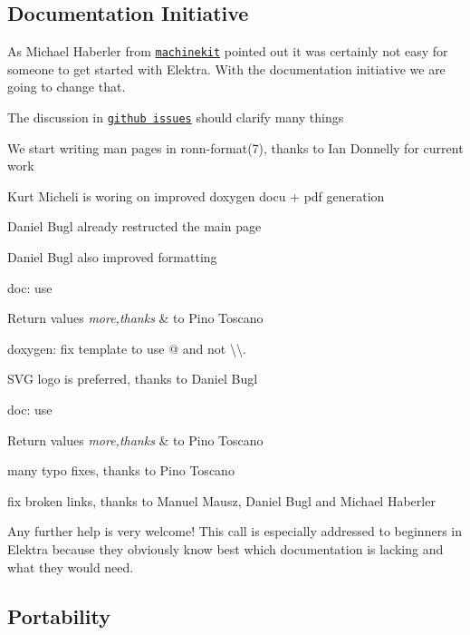 \subsection*{Documentation Initiative}

As Michael Haberler from \href{http://www.machinekit.io/}{\tt machinekit} pointed out it was certainly not easy for someone to get started with Elektra. With the documentation initiative we are going to change that.


\begin{DoxyItemize}
\item The discussion in \href{https://git.libelektra.org/issues}{\tt github issues} should clarify many things
\item We start writing man pages in ronn-\/format(7), thanks to Ian Donnelly for current work
\item Kurt Micheli is woring on improved doxygen docu + pdf generation
\item Daniel Bugl already restructed the main page
\item Daniel Bugl also improved formatting
\item doc\+: use 
\begin{DoxyRetVals}{Return values}
{\em more,thanks} & to Pino Toscano\\
\hline
\end{DoxyRetVals}

\item doxygen\+: fix template to use {\ttfamily @} and not {\ttfamily \textbackslash{}\textbackslash{}}.
\item S\+VG logo is preferred, thanks to Daniel Bugl
\item doc\+: use 
\begin{DoxyRetVals}{Return values}
{\em more,thanks} & to Pino Toscano\\
\hline
\end{DoxyRetVals}

\item many typo fixes, thanks to Pino Toscano
\item fix broken links, thanks to Manuel Mausz, Daniel Bugl and Michael Haberler
\end{DoxyItemize}

Any further help is very welcome! This call is especially addressed to beginners in Elektra because they obviously know best which documentation is lacking and what they would need.

\subsection*{Portability}

